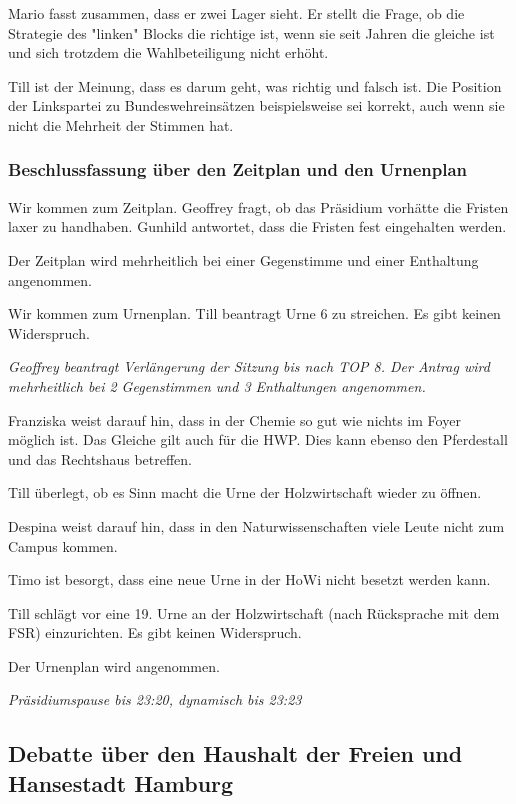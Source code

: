 \documentclass[ngerman,headheight=70pt]{scrartcl}
\begin{document}
    Mario fasst zusammen, dass er zwei Lager sieht. Er stellt die Frage, ob
    die Strategie des "linken" Blocks die richtige ist, wenn sie seit Jahren die
    gleiche ist und sich trotzdem die Wahlbeteiligung nicht erhöht.

    Till ist der Meinung, dass es darum geht, was richtig und falsch ist. Die Position
    der Linkspartei zu Bundeswehreinsätzen beispielsweise sei korrekt, auch wenn
    sie nicht die Mehrheit der Stimmen hat.

    \subsubsection{Beschlussfassung über den Zeitplan und den Urnenplan}

    Wir kommen zum Zeitplan. Geoffrey fragt, ob das Präsidium vorhätte die Fristen
    laxer zu handhaben. Gunhild antwortet, dass die Fristen fest eingehalten werden.

    Der Zeitplan wird mehrheitlich bei einer Gegenstimme und einer Enthaltung
    angenommen.

    Wir kommen zum Urnenplan. Till beantragt Urne 6 zu streichen. Es gibt keinen
    Widerspruch.

    \textit{Geoffrey beantragt Verlängerung der Sitzung bis nach TOP 8. Der Antrag
    wird mehrheitlich bei 2 Gegenstimmen und 3 Enthaltungen angenommen.}

    Franziska weist darauf hin, dass in der Chemie so gut wie nichts im Foyer
    möglich ist. Das Gleiche gilt auch für die HWP. Dies kann ebenso den
    Pferdestall und das Rechtshaus betreffen.

    Till überlegt, ob es Sinn macht die Urne der Holzwirtschaft wieder zu öffnen.

    Despina weist darauf hin, dass in den Naturwissenschaften viele Leute nicht
    zum Campus kommen.

    Timo ist besorgt, dass eine neue Urne in der HoWi nicht besetzt werden kann.

    Till schlägt vor eine 19. Urne an der Holzwirtschaft (nach Rücksprache mit
    dem FSR) einzurichten. Es gibt keinen Widerspruch.

    Der Urnenplan wird angenommen.

    \textit{Präsidiumspause bis 23:20, dynamisch bis 23:23}

    \subsection{Debatte über den Haushalt der Freien und Hansestadt Hamburg}
\end{document}
